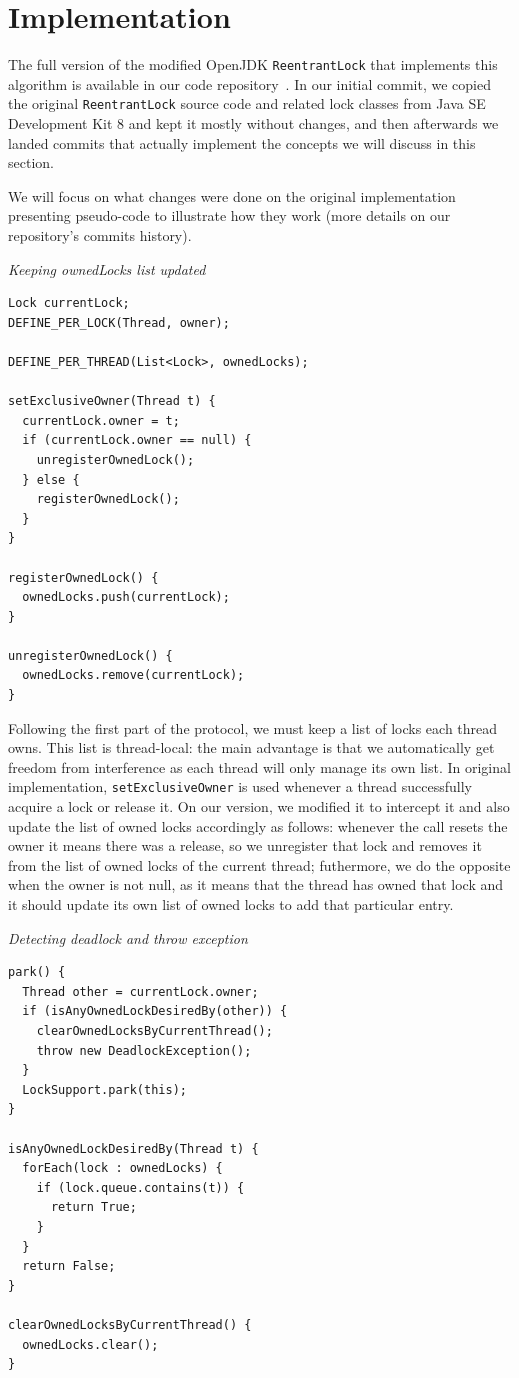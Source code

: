 \section{Implementation}

The full version of the modified OpenJDK {\tt ReentrantLock} that implements this algorithm is available in our code repository~\citep{repo}.
In our initial commit, we copied the original {\tt ReentrantLock} source code and related lock classes from Java SE Development Kit 8 and kept it mostly without changes, and then afterwards we landed commits that actually implement the concepts we will discuss in this section. 

We will focus on what changes were done on the original implementation presenting pseudo-code to illustrate how they work (more details on our repository's commits history).

\medskip
\noindent
{\it Keeping ownedLocks list updated}
\begin{verbatim}
Lock currentLock;
DEFINE_PER_LOCK(Thread, owner);

DEFINE_PER_THREAD(List<Lock>, ownedLocks);

setExclusiveOwner(Thread t) {
  currentLock.owner = t;
  if (currentLock.owner == null) {
    unregisterOwnedLock();
  } else {
    registerOwnedLock();
  }
}

registerOwnedLock() {
  ownedLocks.push(currentLock);
}

unregisterOwnedLock() {
  ownedLocks.remove(currentLock);
}
\end{verbatim}

Following the first part of the protocol, we must keep a list of locks each thread owns.
This list is thread-local: the main advantage is that we automatically get freedom from interference as each thread will only manage its own list.
In original implementation, {\tt setExclusiveOwner} is used whenever a thread successfully acquire a lock or release it.
On our version, we modified it to intercept it and also update the list of owned locks accordingly as follows:
whenever the call resets the owner it means there was a release, so we unregister that lock and removes it from the list of owned locks of the current thread;
futhermore, we do the opposite when the owner is not null, as it means that the thread has owned that lock and it should update its own list of owned locks to add that particular entry.

\medskip
\noindent
{\it Detecting deadlock and throw exception}
\begin{verbatim}
park() {
  Thread other = currentLock.owner;
  if (isAnyOwnedLockDesiredBy(other)) {
    clearOwnedLocksByCurrentThread();
    throw new DeadlockException();
  }
  LockSupport.park(this);
}

isAnyOwnedLockDesiredBy(Thread t) {
  forEach(lock : ownedLocks) {
    if (lock.queue.contains(t)) {
      return True;
    }
  }
  return False;
}

clearOwnedLocksByCurrentThread() {
  ownedLocks.clear();
}
\end{verbatim}

